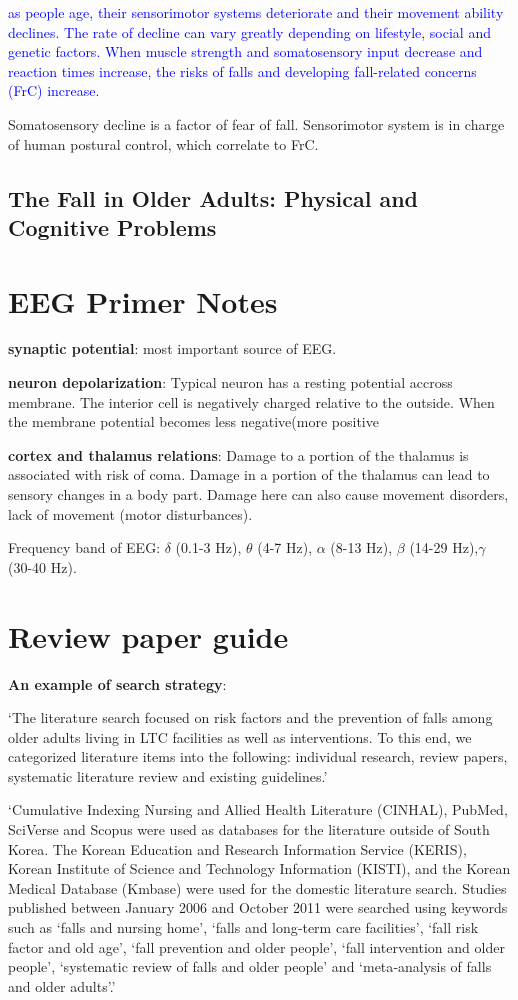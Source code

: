 \documentclass{article}
\begin{document}
\textcolor{blue}{as people age, their sensorimotor systems deteriorate and their movement ability declines. The rate of decline can vary greatly depending on lifestyle, social and genetic factors. When muscle strength and somatosensory input decrease and reaction times increase, the risks of falls and developing fall-related concerns (FrC) increase.}

Somatosensory decline is a factor of fear of fall. Sensorimotor system is in charge of human postural control, which correlate to FrC. 
\subsection{The Fall in Older Adults: Physical and Cognitive Problems}
\cite{Laurence_2017}

\pagebreak

\section{EEG Primer Notes}

\textbf{synaptic potential}: most important source of EEG.

\textbf{neuron depolarization}: Typical neuron has a resting potential accross membrane. The interior cell is negatively charged relative to the outside. When the membrane potential becomes less negative(more positive

\textbf{cortex and thalamus relations}: 
Damage to a portion of the thalamus is associated with risk of coma. Damage in a portion of the thalamus can lead to sensory changes in a body part. Damage here can also cause movement disorders, lack of movement (motor disturbances).

Frequency band of EEG: $\delta$ (0.1-3 Hz), $\theta$ (4-7 Hz), $\alpha$ (8-13 Hz), $\beta$ (14-29 Hz),$\gamma$ (30-40 Hz).
\section{Review paper guide}

\textbf{An example of search strategy}: 

‘The literature search focused on risk factors and the prevention of falls among older adults living in LTC facilities as well as interventions. To this end, we categorized literature items into the following: individual research, review papers, systematic literature review and existing guidelines.’

‘Cumulative Indexing Nursing and Allied Health Literature (CINHAL), PubMed, SciVerse and Scopus were used as databases for the literature outside of South Korea. The Korean Education and Research Information Service (KERIS), Korean Institute of Science and Technology Information (KISTI), and the Korean Medical Database (Kmbase) were used for the domestic literature search. Studies published between January 2006 and October 2011 were searched using keywords such as ‘falls and nursing home’, ‘falls and long‐term care facilities’, ‘fall risk factor and old age’, ‘fall prevention and older people’, ‘fall intervention and older people’, ‘systematic review of falls and older people’ and ‘meta‐analysis of falls and older adults’.’ \cite{Jung_2014}
\end{document}
